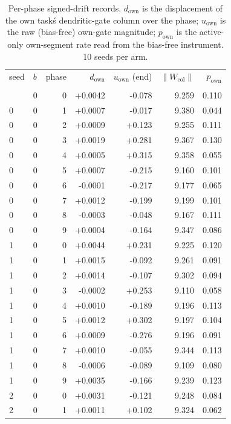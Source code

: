 \documentclass[10pt]{article}
\begin{document}
\begin{longtable}{llrrrrr}
\caption{Per-phase signed-drift records. $d_{\mathrm{own}}$ is the displacement of the own task\'s dendritic-gate column over the phase; $u_{\mathrm{own}}$ is the raw (bias-free) own-gate magnitude; $p_{\mathrm{own}}$ is the active-only own-segment rate read from the bias-free instrument. 10 seeds per arm.}
\label{tab:sup-drift}
\endfirsthead
\toprule
seed & $b$ & phase & $d_{\mathrm{own}}$ & $u_{\mathrm{own}}$ (end) & $\lVert W_{\mathrm{col}}\rVert$ & $p_{\mathrm{own}}$ \\\\
\midrule
\endhead
\bottomrule
\endfoot
\bottomrule
\endlastfoot
0 & 0 & 0 & +0.0042 & -0.078 & 9.259 & 0.110 \\
0 & 0 & 1 & +0.0007 & -0.017 & 9.380 & 0.044 \\
0 & 0 & 2 & +0.0009 & +0.123 & 9.255 & 0.111 \\
0 & 0 & 3 & +0.0019 & +0.281 & 9.367 & 0.130 \\
0 & 0 & 4 & +0.0005 & +0.315 & 9.358 & 0.055 \\
0 & 0 & 5 & +0.0007 & -0.215 & 9.160 & 0.101 \\
0 & 0 & 6 & -0.0001 & -0.217 & 9.177 & 0.065 \\
0 & 0 & 7 & +0.0012 & -0.199 & 9.199 & 0.101 \\
0 & 0 & 8 & -0.0003 & -0.048 & 9.167 & 0.111 \\
0 & 0 & 9 & +0.0004 & -0.164 & 9.347 & 0.086 \\
1 & 0 & 0 & +0.0044 & +0.231 & 9.225 & 0.120 \\
1 & 0 & 1 & +0.0015 & -0.092 & 9.261 & 0.091 \\
1 & 0 & 2 & +0.0014 & -0.107 & 9.302 & 0.094 \\
1 & 0 & 3 & -0.0002 & +0.253 & 9.110 & 0.058 \\
1 & 0 & 4 & +0.0010 & -0.189 & 9.196 & 0.113 \\
1 & 0 & 5 & +0.0012 & +0.302 & 9.197 & 0.104 \\
1 & 0 & 6 & +0.0009 & -0.276 & 9.196 & 0.091 \\
1 & 0 & 7 & +0.0010 & -0.055 & 9.344 & 0.113 \\
1 & 0 & 8 & -0.0006 & -0.089 & 9.109 & 0.080 \\
1 & 0 & 9 & +0.0035 & -0.166 & 9.239 & 0.123 \\
2 & 0 & 0 & +0.0031 & -0.121 & 9.248 & 0.084 \\
2 & 0 & 1 & +0.0011 & +0.102 & 9.324 & 0.062 \\

\end{longtable}
\end{document}
